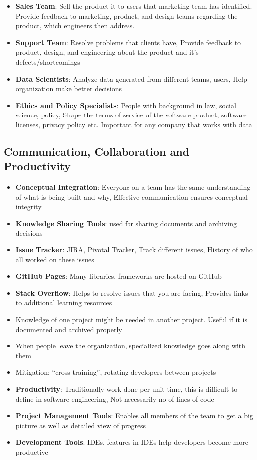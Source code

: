 \documentclass[a4paper]{article}
\begin{document}
\begin{itemize}
    \item \textbf{Sales Team}: Sell the product it to users that marketing team has identified. Provide feedback to marketing, product, and design teams regarding the product, which engineers then address.
    \item \textbf{Support Team}: Resolve problems that clients have, Provide feedback to product, design, and engineering about the product and it’s defects/shortcomings
    \item \textbf{Data Scientists}: Analyze data generated from different teams, users, Help organization make better decisions
    \item \textbf{Ethics and Policy Specialists}: People with background in law, social science, policy, Shape the terms of service of the software product, software licenses, privacy policy etc. Important for any company that works with data
\end{itemize}

\subsection{Communication, Collaboration and Productivity}
\begin{itemize}
    \item \textbf{Conceptual Integration}: Everyone on a team has the same understanding of what is being built and why, Effective communication ensures conceptual integrity
    \item \textbf{Knowledge Sharing Tools}: used for sharing documents and archiving decisions
    \item \textbf{Issue Tracker}: JIRA, Pivotal Tracker, Track different issues, History of who all worked on these issues
    \item \textbf{GitHub Pages}: Many libraries, frameworks are hosted on GitHub
    \item \textbf{Stack Overflow}: Helps to resolve issues that you are facing, Provides links to additional learning resources
    \item Knowledge of one project might be needed in another project. Useful if it is documented and archived properly
    \item When people leave the organization, specialized knowledge goes along with them
    \item Mitigation: “cross-training”, rotating developers between projects
    \item \textbf{Productivity}: Traditionally work done per unit time, this is difficult to define in software engineering, Not necessarily no of lines of code
    \item \textbf{Project Management Tools}: Enables all members of the team to get a big picture as well as detailed view of progress
    \item \textbf{Development Tools}: IDEs, features in IDEs help developers become more productive
\end{itemize}
\end{document}
